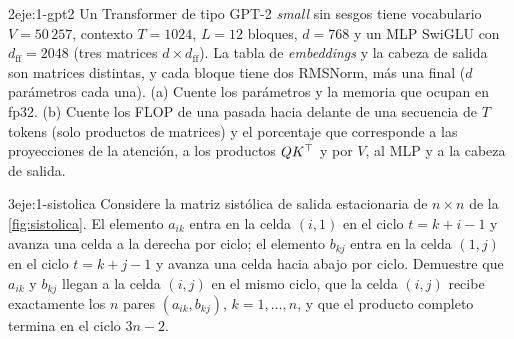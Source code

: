 \begin{ejercicio}{2}{eje:1-gpt2}
Un Transformer de tipo GPT-2 \emph{small} sin sesgos tiene vocabulario $V=50\,257$, contexto $T=1024$, $L=12$ bloques, $d=768$ y un MLP SwiGLU con $d_{\mathrm{ff}}=2048$ (tres matrices $d\times d_{\mathrm{ff}}$). La tabla de \emph{embeddings} y la cabeza de salida son matrices distintas, y cada bloque tiene dos RMSNorm, más una final ($d$ parámetros cada una). (a) Cuente los parámetros y la memoria que ocupan en fp32. (b) Cuente los FLOP de una pasada hacia delante de una secuencia de $T$ tokens (solo productos de matrices) y el porcentaje que corresponde a las proyecciones de la atención, a los productos $QK^{\top}$ y por $V$, al MLP y a la cabeza de salida.
\end{ejercicio}

\begin{ejercicio}{3}{eje:1-sistolica}
Considere la matriz sistólica de salida estacionaria de $n\times n$ de la \cref{fig:sistolica}. El elemento $a_{ik}$ entra en la celda $(i,1)$ en el ciclo $t=k+i-1$ y avanza una celda a la derecha por ciclo; el elemento $b_{kj}$ entra en la celda $(1,j)$ en el ciclo $t=k+j-1$ y avanza una celda hacia abajo por ciclo. Demuestre que $a_{ik}$ y $b_{kj}$ llegan a la celda $(i,j)$ en el mismo ciclo, que la celda $(i,j)$ recibe exactamente los $n$ pares $(a_{ik},b_{kj})$, $k=1,\dots,n$, y que el producto completo termina en el ciclo $3n-2$.
\end{ejercicio}
